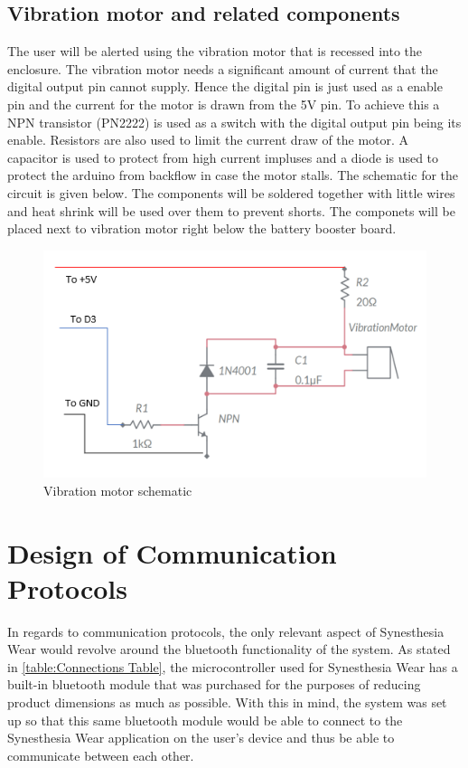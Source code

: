 \documentclass[12pt, titlepage]{article}
\begin{document}
\subsection{Vibration motor and related components}
The user will be alerted using the vibration motor that is recessed into the enclosure. The vibration motor needs a significant amount of current that the digital output pin cannot supply. Hence the digital pin is just used as a enable pin and the current for the motor is drawn from the 5V pin. To achieve this a NPN transistor (PN2222) is used as a switch with the digital output pin being its enable. Resistors are also used to limit the current draw of the motor. A capacitor is used to protect from high current impluses and a diode is used to protect the arduino from backflow in case the motor stalls. The schematic for the circuit is given below. The components will be soldered together with little wires and heat shrink will be used over them to prevent shorts. The componets will be placed next to vibration motor right below the battery booster board. 

 \begin{figure}[H]
\centering
  \includegraphics[width=\textwidth,height=\textheight,keepaspectratio]{MotorSchematic.png}
  \caption{Vibration motor schematic}
  \label{Vibration motor schematic} 
\end{figure}

\section{Design of Communication Protocols}
In regards to communication protocols, the only relevant aspect of Synesthesia Wear would revolve around the bluetooth functionality of the system.
As stated in \autoref{table:Connections Table}, the microcontroller used for Synesthesia Wear has a built-in bluetooth module that was purchased for the purposes of reducing product dimensions as much as possible.
With this in mind, the system was set up so that this same bluetooth module would be able to connect to the Synesthesia Wear application on the user's device and thus be able to communicate between each other.
\end{document}
